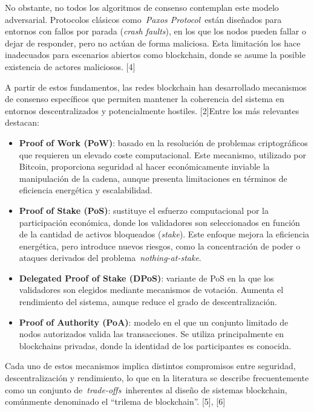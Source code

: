 No obstante, no todos los algoritmos de consenso contemplan este modelo
adversarial. Protocolos clásicos como~\emph{Paxos Protocol}~están
diseñados para entornos con fallos por parada (\emph{crash faults}), en
los que los nodos pueden fallar o dejar de responder, pero no actúan de
forma maliciosa. Esta limitación los hace inadecuados para escenarios
abiertos como blockchain, donde se asume la posible existencia de
actores maliciosos. {[}4{]}

A partir de estos fundamentos, las redes blockchain han desarrollado
mecanismos de consenso específicos que permiten mantener la coherencia
del sistema en entornos descentralizados y potencialmente hostiles.
{[}2{]}Entre los más relevantes destacan:

\begin{itemize}
\item
  \textbf{Proof of Work (PoW)}: basado en la resolución de problemas
  criptográficos que requieren un elevado coste computacional. Este
  mecanismo, utilizado por Bitcoin, proporciona seguridad al hacer
  económicamente inviable la manipulación de la cadena, aunque presenta
  limitaciones en términos de eficiencia energética y escalabilidad.
\item
  \textbf{Proof of Stake (PoS)}: sustituye el esfuerzo computacional por
  la participación económica, donde los validadores son seleccionados en
  función de la cantidad de activos bloqueados (\emph{stake}). Este
  enfoque mejora la eficiencia energética, pero introduce nuevos
  riesgos, como la concentración de poder o ataques derivados del
  problema~\emph{nothing-at-stake}.
\item
  \textbf{Delegated Proof of Stake (DPoS)}: variante de PoS en la que
  los validadores son elegidos mediante mecanismos de votación. Aumenta
  el rendimiento del sistema, aunque reduce el grado de
  descentralización.
\item
  \textbf{Proof of Authority (PoA)}: modelo en el que un conjunto
  limitado de nodos autorizados valida las transacciones. Se utiliza
  principalmente en blockchains privadas, donde la identidad de los
  participantes es conocida.
\end{itemize}

Cada uno de estos mecanismos implica distintos compromisos entre
seguridad, descentralización y rendimiento, lo que en la literatura se
describe frecuentemente como un conjunto de~\emph{trade-offs}~inherentes
al diseño de sistemas blockchain, comúnmente denominado el ``trilema de
blockchain''. {[}5{]}, {[}6{]}

